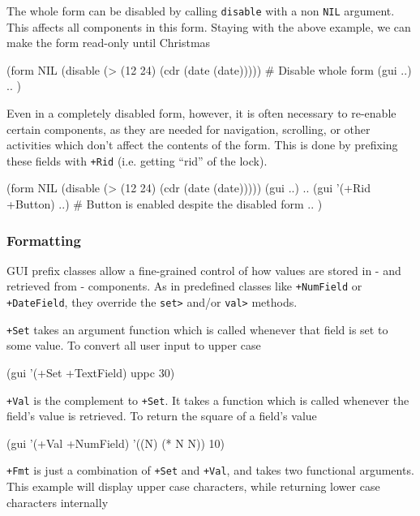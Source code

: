 The whole form can be disabled by calling \texttt{disable} with a non
\texttt{NIL} argument. This affects all components in this form.
Staying with the above example, we can make the form read-only until
Christmas


\begin{wideverbatim}
(form NIL
   (disable (> (12 24) (cdr (date (date)))))  # Disable whole form
   (gui ..)
   .. )
\end{wideverbatim}

Even in a completely disabled form, however, it is often necessary to
re-enable certain components, as they are needed for navigation,
scrolling, or other activities which don't affect the contents of the
form. This is done by prefixing these fields with \texttt{+Rid} (i.e. getting
``rid'' of the lock).


\begin{wideverbatim}
(form NIL
   (disable (> (12 24) (cdr (date (date)))))
   (gui ..)
   ..
   (gui '(+Rid +Button) ..)  # Button is enabled despite the disabled form
   .. )
\end{wideverbatim}


\subsubsection{ Formatting}
\label{sec:appl-devel-formatting}%

GUI prefix classes allow a fine-grained control of how values are stored
in - and retrieved from - components. As in predefined classes like
\texttt{+NumField} or \texttt{+DateField}, they override the \texttt{set>} and/or \texttt{val>}
methods.

\texttt{+Set} takes an argument function which is called whenever that field is
set to some value. To convert all user input to upper case


\begin{wideverbatim}
(gui '(+Set +TextField) uppc 30)
\end{wideverbatim}

\texttt{+Val} is the complement to \texttt{+Set}. It takes a function which is called
whenever the field's value is retrieved. To return the square of a
field's value


\begin{wideverbatim}
(gui '(+Val +NumField) '((N) (* N N)) 10)
\end{wideverbatim}

\texttt{+Fmt} is just a combination of \texttt{+Set} and \texttt{+Val}, and takes two
functional arguments. This example will display upper case characters,
while returning lower case characters internally


